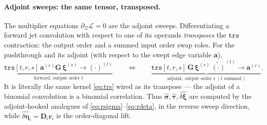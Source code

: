 \documentclass[11pt]{article}
\theoremstyle{definition}
\theoremstyle{plain}
\begin{document}
\paragraph{Adjoint sweeps: the same tensor, transposed.}
The multiplier equations $\partial_\Xi\mathcal L = 0$ are the adjoint sweeps. Differentiating a forward
jet convolution with respect to one of its operands \emph{transposes} the $\texttt{trs}$ contraction:
the output order and a summed input order swap roles. For the pushthrough and its adjoint (with respect
to the swept edge variable $\mathbf a$),
\begin{equation}
  \label{eq:hook}
  \underbrace{\texttt{trs}[t,r,s]\, \mathbf a^{(r)} \mathbf G\, \boldsymbol\xi^{(s)} \to (\cdot)^{(t)}}
  _{\text{forward, output order }t}
  \qquad\Longleftrightarrow\qquad
  \underbrace{\texttt{trs}[t,r,s]\, \mathbf G\, \boldsymbol\xi^{(s)}\, \widetilde{(\cdot)}^{(t)} \to \mathbf a^{(r)}}
  _{\text{adjoint, output order }r\ (t\text{ summed})}.
\end{equation}
It is literally the same kernel \eqref{eq:trs} wired as its transpose --- the adjoint of a binomial
convolution is a binomial correlation. Thus $\widehat{\boldsymbol\sigma},\widehat{\boldsymbol\tau},
\widehat{\delta\boldsymbol\xi}$ are computed by the adjoint-hooked analogues of
\eqref{eq:rsigma}--\eqref{eq:rdeta}, in the reverse sweep direction, while $\widehat{\delta\boldsymbol
\eta}_i = \mathbf D_i \mathbf r_i$ is the order-diagonal lift.
\end{document}

